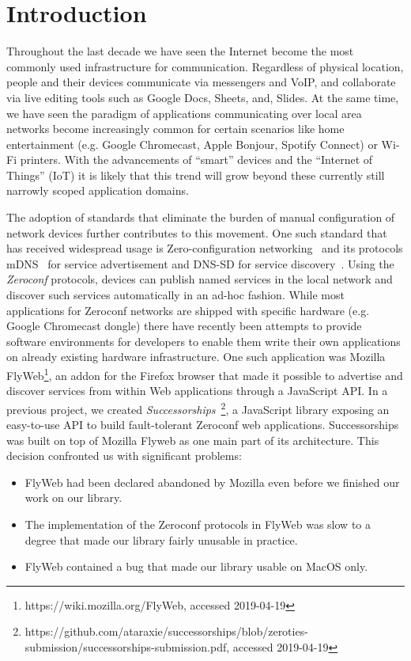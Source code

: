 \section{Introduction}
\label{sec:introduction}

Throughout the last decade we have seen the Internet become the most commonly used infrastructure for communication. Regardless of physical location, people and their devices communicate via messengers and VoIP, and collaborate via live editing tools such as Google Docs, Sheets, and, Slides. 
At the same time, we have seen the paradigm of applications communicating over local area networks become increasingly common for certain scenarios like home entertainment (e.g. Google Chromecast, Apple Bonjour, Spotify Connect) or Wi-Fi printers. 
With the advancements of ``smart'' devices and the ``Internet of Things'' (IoT) it is likely that this trend will grow beyond these currently still narrowly scoped application domains.

The adoption of standards that eliminate the burden of manual configuration of network devices further contributes to this movement. One such standard that has received widespread usage is Zero-configuration networking~\cite{guttman_2001} and its protocols mDNS~\cite{cheshire_2013_mdns} for service advertisement and DNS-SD for service discovery~\cite{cheshire_2013_dnssd}.
Using the \textit{Zeroconf} protocols, devices can publish named services in the local network and discover such services automatically in an ad-hoc fashion.
While most applications for Zeroconf networks are shipped with specific hardware (e.g. Google Chromecast dongle) there have recently been attempts to provide software environments for developers to enable them write their own applications on already existing hardware infrastructure.
One such application was Mozilla FlyWeb\footnote{https://wiki.mozilla.org/FlyWeb, accessed 2019-04-19}, an addon for the Firefox browser that made it possible to advertise and discover services from within Web applications through a JavaScript API.
In a previous project, we created \textit{Successorships}~\footnote{https://github.com/ataraxie/successorships/blob/zeroties-submission/successorships-submission.pdf, accessed 2019-04-19}, a JavaScript library exposing an easy-to-use API to build fault-tolerant Zeroconf web applications.
Successorships was built on top of Mozilla Flyweb as one main part of its architecture.
This decision confronted us with significant problems:
\begin{itemize}
    \item FlyWeb had been declared abandoned by Mozilla even before we finished our work on our library.
    \item The implementation of the Zeroconf protocols in FlyWeb was slow to a degree that made our library fairly unusable in practice.
    \item FlyWeb contained a bug that made our library usable on MacOS only.
\end{itemize}

